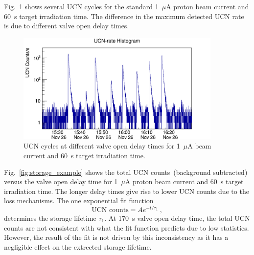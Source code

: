 Fig.~\ref{fig:storage_all} shows several UCN cycles for the standard
1~$\mu$A proton beam current and 60~s target irradiation time. The
difference in the maximum detected UCN rate is due to different valve
open delay times.
\begin{figure}[h!]
  \centering
  \includegraphics[width=0.9\textwidth]{storagetime_all.png}
  \caption[UCN rate at different value open delay times at 1~$\mu$A
  beam current and 60~s irradiation time ]{UCN cycles at different
    valve open delay times for 1~$\mu$A beam current and 60~s target
    irradiation time.}
  \label{fig:storage_all}
\end{figure}
Fig.~\ref{fig:storage_example} shows the total UCN counts~(background
subtracted) versus the valve open delay time for 1~$\mu$A proton beam
current and 60~s target irradiation time. The longer delay times give
rise to lower UCN counts due to the loss mechanisms. The one
exponential fit function
\begin{equation}
\text{UCN counts} = A e^{-t/\tau_1}~,
\end{equation}
determines the storage lifetime $\tau_1$. At 170~s valve open delay
time, the total UCN counts are not consistent with what the fit
function predicts due to low statistics. However, the result of the
fit is not driven by this inconsistency as it has a negligible effect
on the extrected storage lifetime.

